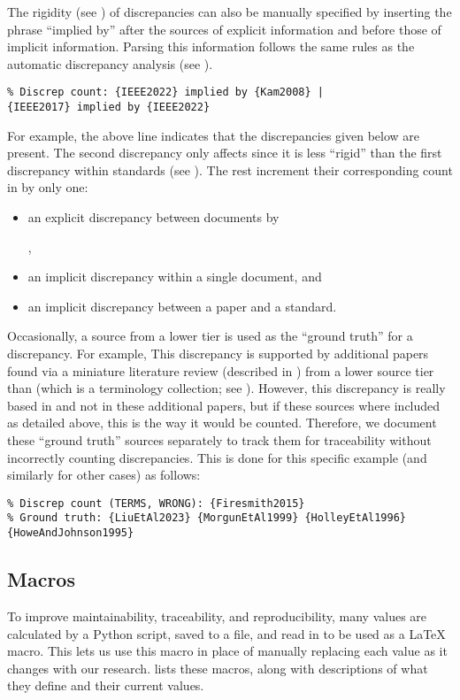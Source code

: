 The rigidity (see ) of discrepancies can also be manually
specified by inserting the phrase ``implied by'' after the sources of explicit
information and before those of implicit information. Parsing this information
follows the same rules as the automatic discrepancy analysis
(see ).
\begin{displayquote}
    \texttt{\% Discrep count: \{IEEE2022\} implied by \{Kam2008\} |\\
        \displayNL \{IEEE2017\} implied by \{IEEE2022\}}
\end{displayquote}
For example, the above line indicates that the discrepancies given below are
present. The second discrepancy only affects  since it
is less ``rigid'' than the first discrepancy within standards (see ).
The rest increment their corresponding count in
 by only one:
\begin{itemize}
    \item an explicit discrepancy between documents by
          \begin{NoHyper}\citeauthor{IEEE2022}\end{NoHyper},
    \item an implicit discrepancy within a single document, and
    \item an implicit discrepancy between a paper and a standard.
\end{itemize}

Occasionally, a source from a lower tier is used as the ``ground truth'' for a
discrepancy. For example, \tolTestingDiscrep*{} This discrepancy is supported
by additional papers found via a miniature literature review (described in
) from a lower source tier than \citep{Firesmith2015}
(which is a terminology collection; see ). However, this
discrepancy is really based in \citep{Firesmith2015} and not in these
additional papers, but if these sources where included as detailed above,
this is the way it would be counted. Therefore, we document these ``ground
truth'' sources separately to track them for traceability without incorrectly
counting discrepancies. This is done for this specific example (and similarly
for other cases) as follows:
\begin{displayquote}
    \texttt{\% Discrep count (TERMS, WRONG): \{Firesmith2015\}\\
        \% Ground truth: \{LiuEtAl2023\} \{MorgunEtAl1999\} \{HolleyEtAl1996\}
        \displayNL \{HoweAndJohnson1995\}}
\end{displayquote}

\subsection{Macros}
To improve maintainability, traceability, and reproducibility, many values are
calculated by a Python script, saved to a file, and read in to be used as a
\LaTeX{} macro. This lets us use this macro in place of manually replacing each
value as it changes with our research.  lists these
macros, along with descriptions of what they define and their current values.


